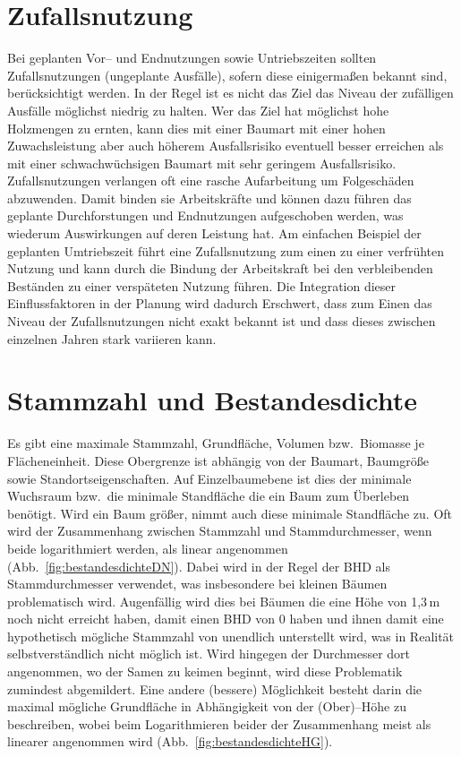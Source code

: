 \documentclass[twocolumn]{scrartcl}
\begin{document}
\section{Zufallsnutzung}

Bei geplanten Vor-- und Endnutzungen sowie Untriebszeiten sollten
Zufallsnutzungen (ungeplante Ausfälle), sofern diese einigermaßen bekannt sind,
berücksichtigt werden. In der Regel ist es nicht das Ziel das Niveau der
zufälligen Ausfälle möglichst niedrig zu halten. Wer das Ziel hat möglichst hohe
Holzmengen zu ernten, kann dies mit einer Baumart mit einer hohen
Zuwachsleistung aber auch höherem Ausfallsrisiko eventuell besser erreichen als
mit einer schwachwüchsigen Baumart mit sehr geringem Ausfallsrisiko.
Zufallsnutzungen verlangen oft eine rasche Aufarbeitung um Folgeschäden
abzuwenden. Damit binden sie Arbeitskräfte und können dazu führen das geplante
Durchforstungen und Endnutzungen aufgeschoben werden, was wiederum Auswirkungen
auf deren Leistung hat. Am einfachen Beispiel der geplanten Umtriebszeit führt
eine Zufallsnutzung zum einen zu einer verfrühten Nutzung und kann durch die
Bindung der Arbeitskraft bei den verbleibenden Beständen zu einer verspäteten
Nutzung führen. Die Integration dieser Einflussfaktoren in der Planung wird
dadurch Erschwert, dass zum Einen das Niveau der Zufallsnutzungen nicht exakt
bekannt ist und dass dieses zwischen einzelnen Jahren stark variieren kann.

\section{Stammzahl und Bestandesdichte}
\label{sec:StammzahlUndBestandesdichte}

Es gibt eine maximale Stammzahl, Grundfläche, Volumen bzw.\ Biomasse je
Flächeneinheit. Diese Obergrenze ist abhängig von der Baumart, Baumgröße sowie
Standortseigenschaften. Auf Einzelbaumebene ist dies der minimale Wuchsraum
bzw.\ die minimale Standfläche die ein Baum zum Überleben benötigt. Wird ein
Baum größer, nimmt auch diese minimale Standfläche zu. Oft wird der Zusammenhang
zwischen Stammzahl und Stammdurchmesser, wenn beide logarithmiert werden, als
linear angenommen (Abb.~\ref{fig:bestandesdichteDN}). Dabei wird in der Regel
der BHD als Stammdurchmesser verwendet, was insbesondere bei kleinen Bäumen
problematisch wird. Augenfällig wird dies bei Bäumen die eine Höhe von 1,3\,m
noch nicht erreicht haben, damit einen BHD von 0 haben und ihnen damit eine
hypothetisch mögliche Stammzahl von unendlich unterstellt wird, was in Realität
selbstverständlich nicht möglich ist. Wird hingegen der Durchmesser dort
angenommen, wo der Samen zu keimen beginnt, wird diese Problematik zumindest
abgemildert. Eine andere (bessere) Möglichkeit besteht darin die maximal
mögliche Grundfläche in Abhängigkeit von der (Ober)--Höhe zu beschreiben, wobei
beim Logarithmieren beider der Zusammenhang meist als linearer angenommen wird
(Abb.~\ref{fig:bestandesdichteHG}).
\end{document}

